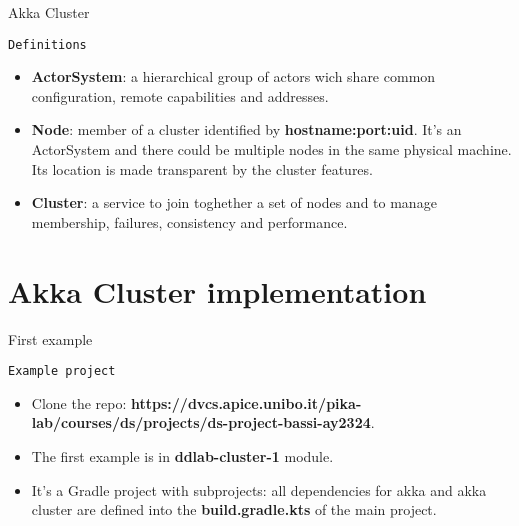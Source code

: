 \documentclass[presentation,apice]{beamer}\mode<presentation>{\usetheme{AMSBolognaFC}}
\begin{document}
\begin{frame}[c,fragile]{Akka Cluster}
\begin{block}{\texttt{Definitions}}
\begin{itemize}
    \item \textbf{ActorSystem}: a hierarchical group of actors wich share common configuration, remote capabilities and addresses.
    \item \textbf{Node}: member of a cluster identified by \textbf{hostname:port:uid}. It's an ActorSystem and there could be multiple nodes in the same physical machine. Its location is made transparent by the cluster features.
    \item \textbf{Cluster}: a service to join toghether a set of nodes and to manage membership, failures, consistency and performance.
\end{itemize}
\end{block}
\end{frame}

\begin{comment}
\begin{frame}[c,fragile]{Akka Cluster}
%
\begin{block}{\texttt{Introduction to Akka Cluster}}
\textbf{\textit{TODO: [Theory] Some slides to introduce Akka Cluster like: node status transitions, gossip protocol and vector clocks, failure detection, seed nodes and stuff like that.}}
\end{block}
%
\end{frame}
\end{comment}

\section{Akka Cluster implementation}
\begin{frame}[c,fragile]{First example}
%
\begin{block}{\texttt{Example project}}
\begin{itemize}
    \item Clone the repo: \textbf{https://dvcs.apice.unibo.it/pika-lab/courses/ds/projects/ds-project-bassi-ay2324}.
    \item The first example is in \textbf{ddlab-cluster-1} module.
    \item It's a Gradle project with subprojects: all dependencies for akka and akka cluster are defined into the \textbf{build.gradle.kts} of the main project.
\end{itemize}
\end{block}
%
\end{frame}
\end{document}
